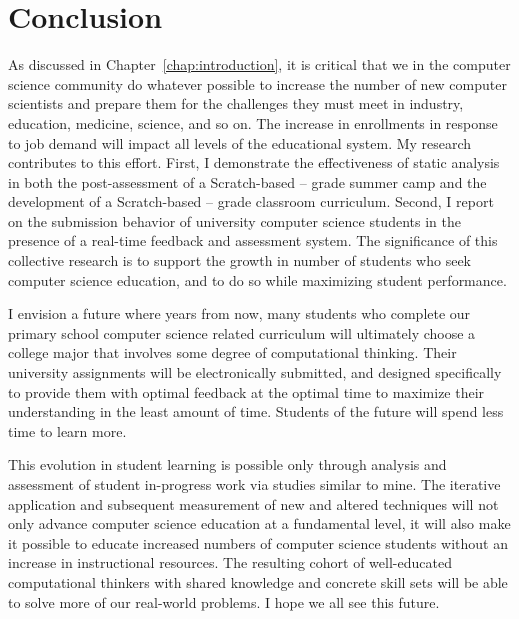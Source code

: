 \chapter{Conclusion} \label{chap:conclusion}

As discussed in Chapter~\ref{chap:introduction}, it is critical that we in the
computer science community do whatever possible to increase the number of new
computer scientists and prepare them for the challenges they must meet in
industry, education, medicine, science, and so on. The increase in enrollments
in response to job demand will impact all levels of the educational system. My
research contributes to this effort. First, I demonstrate the effectiveness of
static analysis in both the post-assessment of a Scratch-based --
grade summer camp and the development of a Scratch-based -- grade
classroom curriculum. Second, I report on the submission behavior of university
computer science students in the presence of a real-time feedback and
assessment system. The significance of this collective research is to support
the growth in number of students who seek computer science education, and to do
so while maximizing student performance.

I envision a future where years from now, many students who complete our
primary school computer science related curriculum will ultimately choose a
college major that involves some degree of computational thinking. Their
university assignments will be electronically submitted, and designed
specifically to provide them with optimal feedback at the optimal time to
maximize their understanding in the least amount of time. Students of the
future will spend less time to learn more.

This evolution in student learning is possible only through analysis and
assessment of student in-progress work via studies similar to mine. The
iterative application and subsequent measurement of new and altered techniques
will not only advance computer science education at a fundamental level, it
will also make it possible to educate increased numbers of computer science
students without an increase in instructional resources. The resulting cohort
of well-educated computational thinkers with shared knowledge and concrete
skill sets will be able to solve more of our real-world problems. I hope we all
see this future.
